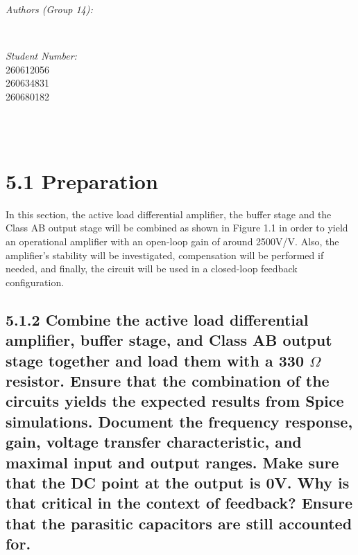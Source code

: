 \documentclass[12pt]{article}
\makeatletter
\let\theauthor\@author
\let\thedate\@date
\makeatother
\begin{document}
\begin{titlepage}
\begin{minipage}{0.4\textwidth}
\begin{flushleft}
            \emph{Authors (Group 14):}\\
            \theauthor
            \end{flushleft}
            \end{minipage}~
            \begin{minipage}{0.4\textwidth}
            \begin{flushright} \large
            \emph{Student Number:} \\
            260612056 \\ 260634831 \\ 260680182                                  %
        \end{flushright}
    \end{minipage}\\[2 cm]
 
    {\large \thedate}\\[2 cm]
 
    \vfill
    
\end{titlepage}


\section*{5.1 Preparation}

In this section, the active load differential amplifier, the buffer stage and the Class AB 
output stage will be combined as shown in Figure 1.1 in order to yield an operational 
amplifier with an open-loop gain of around 2500V/V. Also, the amplifier’s stability will 
be investigated, compensation will be performed if needed, and finally, the circuit will 
be used in a closed-loop feedback configuration.

\subsection*{5.1.2 Combine the active load differential amplifier, buffer stage, and 
Class AB output stage together and load them with a 330 $\Omega$ resistor. Ensure that the 
combination of the circuits yields the expected results from Spice simulations. Document 
the frequency response, gain, voltage transfer characteristic, and maximal input and 
output ranges. Make sure that the DC point at the output is 0V. Why is that critical in 
the context of feedback? Ensure that the parasitic capacitors are still accounted for. }
\end{document}
